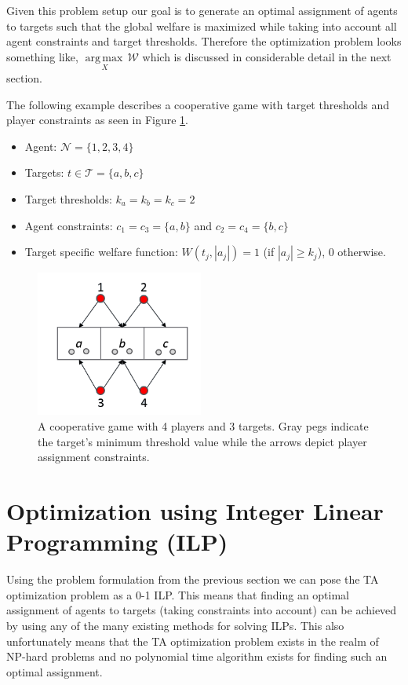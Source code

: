 \documentclass[11pt, onecolumn, compsoc, letterpaper]{article}
\DeclareMathOperator*{\argmaxop}{arg\,max\,}
\newcommand{\argmax}[1]{\underset{#1}{\argmaxop}}
\newcommand{\Pl}{\mathcal{N}} %
\newcommand{\Ta}{\mathcal{T}} %
\newcommand{\We}{\mathcal{W}} %
\begin{document}
Given this problem setup our goal is to generate an optimal assignment of agents to targets such that the global welfare is maximized while taking into account all agent constraints and target thresholds. Therefore the optimization problem looks something like, $\argmax{X} \We$ which is discussed in considerable detail in the next section.

The following example describes a cooperative game with target thresholds and player constraints as seen in Figure \ref{fig:ex1}.
\begin{itemize}
	\item Agent: $\Pl = \{1,2,3,4\}$
	\item Targets: $t \in \Ta = \{a, b, c\}$
	\item Target thresholds: $k_a = k_b = k_c = 2$
	\item Agent constraints: $c_1 = c_3 = \{a, b\}$ and $c_2 = c_4 = \{b, c\}$
	\item Target specific welfare function: $W(t_j, |a_j|) = 1$ (if $|a_j| \geq k_j$), $0$ otherwise.
	
\end{itemize}
\begin{figure}[!htb]
	\centering\includegraphics[width=5.5cm]{assets/ex1.png}
	\centering\caption{A cooperative game with 4 players and 3 targets. Gray pegs indicate the target's minimum threshold value while the arrows depict player assignment constraints.}\label{fig:ex1}
\end{figure}

\section{Optimization using Integer Linear Programming (ILP)}
Using the problem formulation from the previous section we can pose the TA optimization problem as a 0-1 ILP. This means that finding an optimal assignment of agents to targets (taking constraints into account) can be achieved by using any of the many existing methods for solving ILPs. This also unfortunately means that the TA optimization problem exists in the realm of NP-hard problems and no polynomial time algorithm exists for finding such an optimal assignment. 
\end{document}
